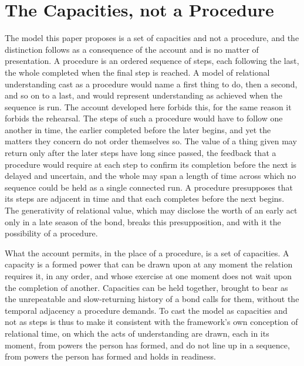 \section{The Capacities, not a Procedure}
\label{p27:sec:capacities}

\noindent
The model this paper proposes is a set of capacities and not a procedure, and the distinction follows as a consequence of the account and is no matter of presentation. A procedure is an ordered sequence of steps, each following the last, the whole completed when the final step is reached. A model of relational understanding cast as a procedure would name a first thing to do, then a second, and so on to a last, and would represent understanding as achieved when the sequence is run. The account developed here forbids this, for the same reason it forbids the rehearsal. The steps of such a procedure would have to follow one another in time, the earlier completed before the later begins, and yet the matters they concern do not order themselves so. The value of a thing given may return only after the later steps have long since passed, the feedback that a procedure would require at each step to confirm its completion before the next is delayed and uncertain, and the whole may span a length of time across which no sequence could be held as a single connected run. A procedure presupposes that its steps are adjacent in time and that each completes before the next begins. The generativity of relational value, which may disclose the worth of an early act only in a late season of the bond, breaks this presupposition, and with it the possibility of a procedure.

What the account permits, in the place of a procedure, is a set of capacities. A capacity is a formed power that can be drawn upon at any moment the relation requires it, in any order, and whose exercise at one moment does not wait upon the completion of another. Capacities can be held together, brought to bear as the unrepeatable and slow-returning history of a bond calls for them, without the temporal adjacency a procedure demands. To cast the model as capacities and not as steps is thus to make it consistent with the framework's own conception of relational time, on which the acts of understanding are drawn, each in its moment, from powers the person has formed, and do not line up in a sequence, from powers the person has formed and holds in readiness.

